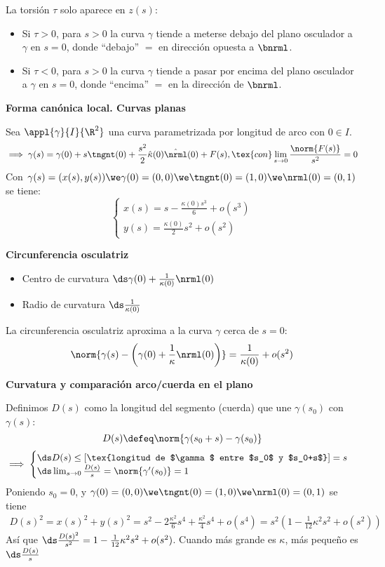 La torsión $\tau$ solo aparece en $z(s)$:
\begin{itemize}
	\item Si $\tau > 0$, para $s>0$ la curva $\gamma$ tiende a meterse debajo del plano osculador a $\gamma$ en $s=0$, donde ``debajo'' $=$ en dirección opuesta a $\bnrml$.
	\item Si $\tau < 0$, para $s>0$ la curva $\gamma$ tiende a pasar por encima del plano osculador a $\gamma$ en $s=0$, donde ``encima'' $=$ en la dirección de $\bnrml$.
\end{itemize}

\textbf{Forma canónica local. Curvas planas}

Sea $\appl{\gamma}{I}{\R^2}$ una curva parametrizada por longitud de arco con $0\in I$.
\[\implies \gamma(s)=\gamma(0)+s\tngnt(0)+\frac{s^2}{2}\hat{\kappa}(0)\hat{\nrml}(0) + F(s), \tex{ con } \lim_{s\to 0}\frac{\norm{F(s)}}{s^2} = 0\]
Con $\gamma(s)=(x(s), y(s)) \we \gamma(0)=(0,0) \we \tngnt(0)=(1, 0) \we \nrml(0)=(0,1)$ se tiene:
\[\begin{cases}
		x(s)=s-\frac{\kappa(0)s^3}{6}+o(s^3) \\
		y(s)=\frac{\kappa(0)}{2}s^2 + o(s^2)
	\end{cases}\]

\textbf{Circunferencia osculatriz}

\begin{itemize}
	\item Centro de curvatura $\ds \gamma(0) + \frac{1}{\kappa(0)}\nrml(0)$
	\item Radio de curvatura $\ds \frac{1}{\kappa(0)}$
\end{itemize}
La circunferencia osculatriz aproxima a la curva $\gamma$ cerca de $s=0$:
\[\norm{\gamma(s)-\left(\gamma(0) + \frac{1}{\kappa}\nrml(0)\right)}=\frac{1}{\kappa(0)} + o(s^2)\]

\textbf{Curvatura y comparación arco/cuerda en el plano}

Definimos $D(s)$ como la longitud del segmento (cuerda) que une $\gamma(s_0)$ con $\gamma(s)$: \[D(s)\defeq \norm{\gamma(s_0+s) - \gamma(s_0)}\]
\[\implies \begin{cases}
		\ds D(s) \leq \left[\tex{longitud de $\gamma$ entre $s_0$ y $s_0+s$}\right] = s \\
		\ds \lim_{s\to 0} \textstyle \frac{D(s)}{s} = \norm{\gamma'(s_0)} = 1
	\end{cases}\]
Poniendo $s_0=0$, y $\gamma(0)=(0,0) \we \tngnt(0)=(1, 0) \we \nrml(0)=(0, 1)$ se tiene
\[\begin{aligned} D(s)^2 = x(s)^2+y(s)^2 = s^2-2\frac{\kappa^2}{6}s^4 + \frac{\kappa^2}{4}s^4 + o(s^4) = s^2\left(1-\frac{1}{12}\kappa^2s^2+o(s^2)\right)\end{aligned}\]
Así que $\ds \frac{D(s)^2}{s^2} = 1-\frac{1}{12}\kappa^2s^2+o(s^2)$. Cuando más grande es $\kappa$, más pequeño es $\ds \frac{D(s)}{s}$

